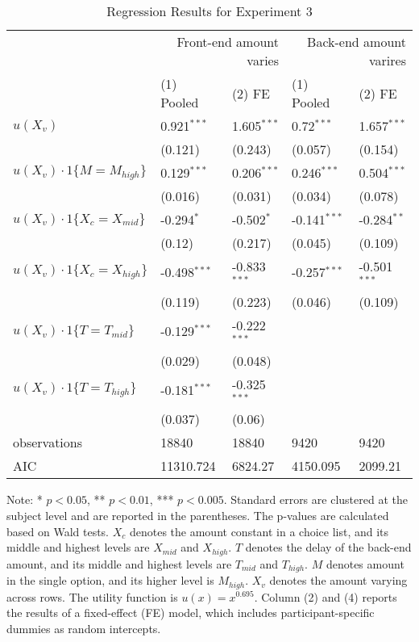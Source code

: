 \documentclass[12pt]{article}
\begin{document}
\begin{table}
    \caption{Regression Results for Experiment 3}
    \vspace*{12pt}
    \centering

      \begin{tabular}{lllll}
\hline
 & \multicolumn{2}{r}{Front-end amount varies} & \multicolumn{2}{r}{Back-end amount varires} \\
 & (1) Pooled & (2) FE & (1) Pooled & (2) FE \\
\hline
$u(X_v)$ & 0.921$^{***}$ & 1.605$^{***}$ & 0.72$^{***}$ & 1.657$^{***}$ \\
 & (0.121) & (0.243) & (0.057) & (0.154) \\
$u(X_v)\cdot1\{M=M_{high}\}$ & 0.129$^{***}$ & 0.206$^{***}$ & 0.246$^{***}$ & 0.504$^{***}$ \\
 & (0.016) & (0.031) & (0.034) & (0.078) \\
$u(X_v)\cdot1\{X_c=X_{mid}\}$ & -0.294$^{*}$ & -0.502$^{*}$ & -0.141$^{***}$ & -0.284$^{**}$ \\
 & (0.12) & (0.217) & (0.045) & (0.109) \\
$u(X_v)\cdot1\{X_c=X_{high}\}$ & -0.498$^{***}$ & -0.833$^{***}$ & -0.257$^{***}$ & -0.501$^{***}$ \\
 & (0.119) & (0.223) & (0.046) & (0.109) \\
$u(X_v)\cdot1\{T=T_{mid}\}$ & -0.129$^{***}$ & -0.222$^{***}$ &  &  \\
 & (0.029) & (0.048) &  &  \\
$u(X_v)\cdot1\{T=T_{high}\}$ & -0.181$^{***}$ & -0.325$^{***}$ &  &  \\
 & (0.037) & (0.06) &  &  \\\hline

observations & 18840 & 18840 & 9420 & 9420 \\
AIC & 11310.724 & 6824.27 & 4150.095 & 2099.21 \\
\hline
\end{tabular}

    \vspace*{4pt}
    \centering
    \begin{minipage}{0.85\textwidth}
    {\par\footnotesize Note: * $p<0.05$, ** $p<0.01$, *** $p<0.005$. Standard errors are clustered at the subject level and are reported in the parentheses. The p-values are calculated based on Wald tests. $X_c$ denotes the amount constant in a choice list, and its middle and highest levels are $X_{mid}$ and $X_{high}$. $T$ denotes the delay of the back-end amount, and its middle and highest levels are $T_{mid}$ and $T_{high}$. $M$ denotes amount in the single option, and its higher level is $M_{high}$. $X_v$ denotes the amount varying across rows. The utility function is $u(x)=x^{0.695}$. Column (2) and (4) reports the results of a fixed-effect (FE) model, which includes participant-specific dummies as random intercepts.}
    \end{minipage}
    \label{tab:exp1_reg_utility}
\end{table}
\end{document}
